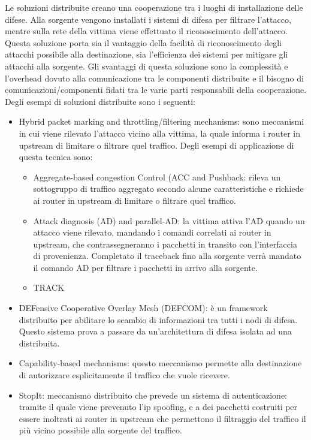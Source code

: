 Le soluzioni distribuite creano una cooperazione tra i luoghi di installazione delle difese. Alla sorgente vengono installati i sistemi di difesa per filtrare l'attacco, mentre sulla rete della vittima viene effettuato il riconoscimento dell'attacco. Questa soluzione porta sia il vantaggio della facilità di riconoscimento degli attacchi possibile alla destinazione, sia l'efficienza dei sistemi per mitigare gli attacchi alla sorgente.
Gli svantaggi di questa soluzione sono la complessità e l'overhead dovuto alla comunicazione tra le componenti distribuite e il bisogno di comunicazioni/componenti fidati tra le varie parti responsabili della cooperazione.
Degli esempi di soluzioni distribuite sono i seguenti:
\begin{itemize}
    \item Hybrid packet marking and throttling/filtering mechanisms: sono meccanismi in cui viene rilevato l'attacco vicino alla vittima, la quale informa i router in upstream di limitare o filtrare quel traffico. Degli esempi di applicazione di questa tecnica sono:
    \begin{itemize}
        \item Aggregate-based  congestion Control (ACC and Pushback: rileva un sottogruppo di traffico aggregato secondo alcune caratteristiche e richiede ai router in upstream di limitare o filtrare quel traffico.
        \item Attack diagnosis (AD) and parallel-AD: la vittima attiva l'AD quando un attacco viene rilevato, mandando i comandi correlati ai router in upstream, che contrassegneranno i pacchetti in transito con l'interfaccia di provenienza. Completato il traceback fino alla sorgente verrà mandato il comando AD per filtrare i pacchetti in arrivo alla sorgente.
        \item TRACK
    \end{itemize}
    \item DEFensive Cooperative Overlay Mesh (DEFCOM): è un framework distribuito per abilitare lo scambio di informazioni tra tutti i nodi di difesa. Questo sistema prova a passare da un'architettura di difesa isolata ad una distribuita.
    \item Capability-based mechanisms: questo meccanismo permette alla destinazione di autorizzare esplicitamente il traffico che vuole ricevere.
    \item StopIt: meccanismo distribuito che prevede un sistema di autenticazione: tramite il quale viene prevenuto l'ip spoofing, e a dei pacchetti costruiti per essere inoltrati ai router in upstream che permettono il filtraggio del traffico il più vicino possibile alla sorgente del traffico.

\end{itemize}

